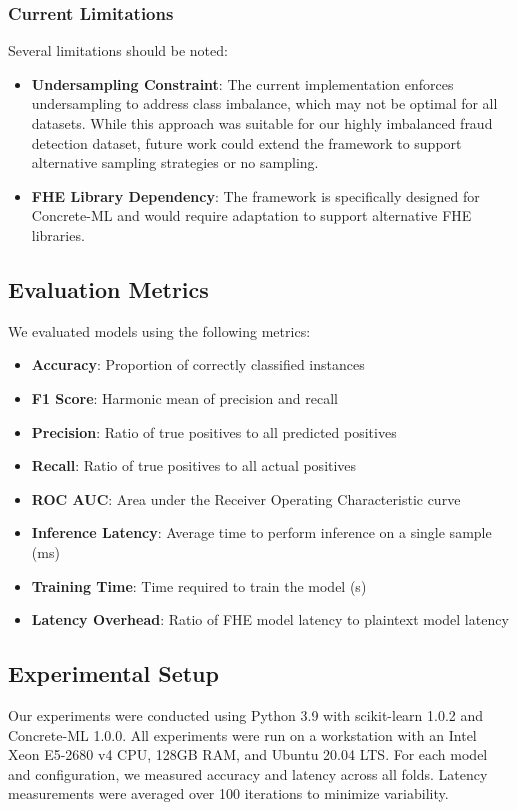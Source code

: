 \documentclass[a4paper,12pt]{article}
\begin{document}
\subsubsection{Current Limitations}
Several limitations should be noted:

\begin{itemize}
    \item \textbf{Undersampling Constraint}: The current implementation enforces undersampling to address class imbalance, which may not be optimal for all datasets. While this approach was suitable for our highly imbalanced fraud detection dataset, future work could extend the framework to support alternative sampling strategies or no sampling.
    
    \item \textbf{FHE Library Dependency}: The framework is specifically designed for Concrete-ML and would require adaptation to support alternative FHE libraries.
    
    \end{itemize}

\subsection{Evaluation Metrics}
We evaluated models using the following metrics:

\begin{itemize}
    \item \textbf{Accuracy}: Proportion of correctly classified instances
    \item \textbf{F1 Score}: Harmonic mean of precision and recall
    \item \textbf{Precision}: Ratio of true positives to all predicted positives
    \item \textbf{Recall}: Ratio of true positives to all actual positives
    \item \textbf{ROC AUC}: Area under the Receiver Operating Characteristic curve
    \item \textbf{Inference Latency}: Average time to perform inference on a single sample (ms)
    \item \textbf{Training Time}: Time required to train the model (s)
    \item \textbf{Latency Overhead}: Ratio of FHE model latency to plaintext model latency
\end{itemize}

\subsection{Experimental Setup}
Our experiments were conducted using Python 3.9 with scikit-learn 1.0.2 and Concrete-ML 1.0.0. All experiments were run on a workstation with an Intel Xeon E5-2680 v4 CPU, 128GB RAM, and Ubuntu 20.04 LTS. For each model and configuration, we measured accuracy and latency across all folds. Latency measurements were averaged over 100 iterations to minimize variability.
\end{document}
